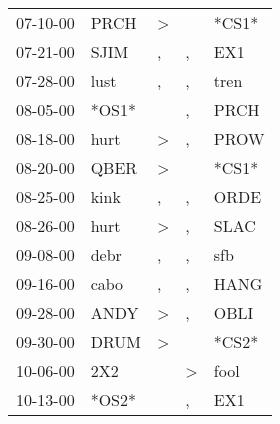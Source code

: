 \begin{supertabular}{p{0.07\textwidth}p{0.06\textwidth}p{0.02\textwidth}p{0.02\textwidth}p{0.06\textwidth}}
          07-10-00\textsuperscript{} &           PRCH\textsuperscript{} &     \textgreater &                  &                            *CS1* \\
          07-21-00\textsuperscript{} &           SJIM\textsuperscript{} &                , &                , &            EX1\textsuperscript{} \\
          07-28-00\textsuperscript{} &           lust\textsuperscript{} &                , &                , &           tren\textsuperscript{} \\
          08-05-00\textsuperscript{} &                            *OS1* &                  &                , &           PRCH\textsuperscript{} \\
          08-18-00\textsuperscript{} &           hurt\textsuperscript{} &     \textgreater &                , &           PROW\textsuperscript{} \\
          08-20-00\textsuperscript{} &           QBER\textsuperscript{} &     \textgreater &                  &                            *CS1* \\
          08-25-00\textsuperscript{} &           kink\textsuperscript{} &                , &                , &           ORDE\textsuperscript{} \\
          08-26-00\textsuperscript{} &           hurt\textsuperscript{} &     \textgreater &                , &           SLAC\textsuperscript{} \\
          09-08-00\textsuperscript{} &           debr\textsuperscript{} &                , &                , &            sfb\textsuperscript{} \\
          09-16-00\textsuperscript{} &           cabo\textsuperscript{} &                , &                , &           HANG\textsuperscript{} \\
          09-28-00\textsuperscript{} &           ANDY\textsuperscript{} &     \textgreater &                , &           OBLI\textsuperscript{} \\
          09-30-00\textsuperscript{} &           DRUM\textsuperscript{} &     \textgreater &                  &                            *CS2* \\
          10-06-00\textsuperscript{} &            2X2\textsuperscript{} &                  &     \textgreater &           fool\textsuperscript{} \\
          10-13-00\textsuperscript{} &                            *OS2* &                  &                , &            EX1\textsuperscript{} \\

\end{supertabular}
